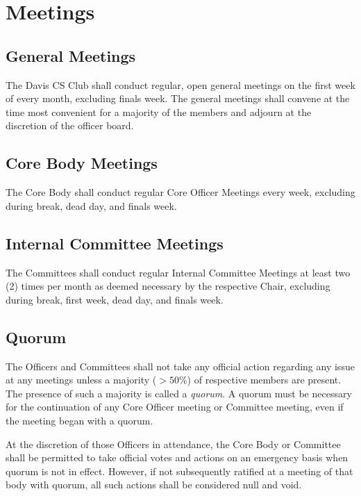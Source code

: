 \documentclass{article}
\begin{document}
\section{Meetings}

\subsection{General Meetings}
The Davis CS Club shall conduct regular, open general meetings on the first week of every month, excluding finals week. The general meetings shall convene at the time most convenient for a majority of the members and adjourn at the discretion of the officer board.

\subsection{Core Body Meetings}
The Core Body shall conduct regular Core Officer Meetings every week, excluding during break, dead day, and finals week.

\subsection{Internal Committee Meetings}
The Committees shall conduct regular Internal Committee Meetings at least two (2) times per month as deemed necessary by the respective Chair, excluding during break, first week, dead day, and finals week.


\subsection{Quorum}
The Officers and Committees shall not take any official action regarding any issue at any meetings unless a majority ($>50\%$) of respective members are present. The presence of such a majority is called a \textit{quorum}. A quorum must be necessary for the continuation of any Core Officer meeting or Committee meeting, even if the meeting began with a quorum.

At the discretion of those Officers in attendance, the Core Body or Committee shall be permitted to take official votes and actions on an emergency basis when quorum is not in effect. However, if not subsequently ratified at a meeting of that body with quorum, all such actions shall be considered null and void.

\end{document}
